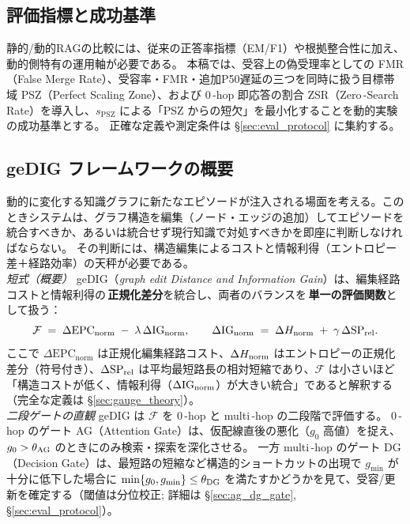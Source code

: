 \documentclass[ja=standard,xelatex]{bxjsarticle}
\newcommand{\F}{\mathcal{F}}
\newcommand{\gednorm}{\Delta\mathrm{EPC}_{\mathrm{norm}}}
\newcommand{\ignorm}{\Delta\mathrm{IG}_{\mathrm{norm}}}
\begin{document}
\subsection{評価指標と成功基準}
静的/動的RAGの比較には、従来の正答率指標（EM/F1）や根拠整合性に加え、動的側特有の運用軸が必要である。
本稿では、受容上の偽受理率としての FMR（False Merge Rate）、受容率・FMR・追加P50遅延の三つを同時に扱う目標帯域 PSZ（Perfect Scaling Zone）、および 0\,\mbox{-}hop 即応答の割合 ZSR（Zero\,\mbox{-}Search Rate）を導入し、$s_{\mathrm{PSZ}}$ による「PSZ からの短欠」を最小化することを動的実験の成功基準とする。
正確な定義や測定条件は \S\ref{sec:eval_protocol} に集約する。

\subsection{geDIG フレームワークの概要}
動的に変化する知識グラフに新たなエピソードが注入される場面を考える。このときシステムは、グラフ構造を編集（ノード・エッジの追加）してエピソードを統合すべきか、あるいは統合せず現行知識で対処すべきかを即座に判断しなければならない。
その判断には、構造編集によるコストと情報利得（エントロピー差＋経路効率）の天秤が必要である。
\\
\noindent\textit{短式（概要）}\; geDIG（\textit{graph edit Distance and Information Gain}）は、編集経路コストと情報利得の\,\textbf{正規化差分}を統合し、両者のバランスを\,\textbf{単一の評価関数}として扱う：
\begin{equation}
  \F\;=\;\gednorm\; -\; \lambda\,\ignorm,\qquad
  \ignorm\;=\;\Delta H_{\rm norm}\; +\; \gamma\,\Delta\mathrm{SP}_{\rm rel}.\label{eq:F_short_intro}
\end{equation}
ここで $\gednorm$ は正規化編集経路コスト、$\Delta H_{\rm norm}$ はエントロピーの正規化差分（符号付き）、$\Delta\mathrm{SP}_{\rm rel}$ は平均最短路長の相対短縮であり、$\F$ は小さいほど「構造コストが低く、情報利得（$\Delta\mathrm{IG}_{\rm norm}$）が大きい統合」であると解釈する（完全な定義は \S\ref{sec:gauge_theory}）。
\\
\noindent\textit{二段ゲートの直観}\; geDIG は $\F$ を 0\,\mbox{-}hop と multi\,\mbox{-}hop の二段階で評価する。
0\,\mbox{-}hop のゲート AG（Attention Gate）は、仮配線直後の悪化（$g_0$ 高値）を捉え、$g_0>\theta_{\rm AG}$ のときにのみ検索・探索を深化させる。
一方 multi\,\mbox{-}hop のゲート DG（Decision Gate）は、最短路の短縮など構造的ショートカットの出現で $g_{\min}$ が十分に低下した場合に $\min\{g_0,g_{\min}\}\le\theta_{\rm DG}$ を満たすかどうかを見て、受容/更新を確定する（閾値は分位校正; 詳細は \S\ref{sec:ag_dg_gate}, \S\ref{sec:eval_protocol}）。
\end{document}
